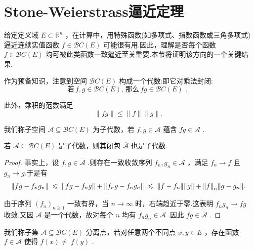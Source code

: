 \section{Stone-Weierstrass逼近定理}

给定定义域 $E \subset  {\mathbb{R}}^{n}$ ，在计算中，用特殊函数(如多项式、指数函数或三角多项式)逼近连续实值函数 $f \in  \mathcal{B}C\left( E\right)$ 可能很有用.因此，理解是否每个函数 $f \in  \mathcal{B}C\left( E\right)$ 均可被此类函数一致逼近至关重要.本节将证明该方向的一个关键结果.

作为预备知识，注意到空间 $\mathcal{B}C\left( E\right)$ 构成一个代数:即它对乘法封闭:
\[
\text{若}\,f,g \in  \mathcal{B}C\left( E\right),\,\text{那么}\,{fg} \in  \mathcal{B}C\left( E\right) \text{ . }
\]

此外，乘积的范数满足
\[
\| {fg}\|  \leq  \| f\| \| g\| .
\]

我们称子空间 $\mathcal{A} \subseteq  \mathcal{B}C\left( E\right)$ 为子代数，若 $f,g \in  \mathcal{A}$ 蕴含 ${fg} \in  \mathcal{A}$ .

\begin{lemma}[子代数的闭包]\label{lem:subalgebra-closure}
若 $\mathcal{A} \subseteq  \mathcal{B}C\left( E\right)$ 是子代数，则其闭包 $\overline{\mathcal{A}}$ 也是子代数.
\end{lemma}

\begin{proof}
事实上，设 $f,g \in  \overline{\mathcal{A}}$ .则存在一致收敛序列 ${f}_{n},{g}_{n} \in  \mathcal{A}$ ，满足 ${f}_{n} \rightarrow  f$ 且 ${g}_{n} \rightarrow  g$.于是有
\[
\norm{{fg} - {f}_{n}{g}_{n}}\; \leqslant  \;\norm{{fg} - {f}_{n}g} + \norm{{f}_{n}g - {f}_{n}{g}_{n}}\; \leqslant  \;\norm{f - {f}_{n}}\norm{g} + \norm{f}_{n}\norm{g - {g}_{n}}.
\]

由于序列 ${\left( {f}_{n}\right) }_{n \geq  1}$ 一致有界，当 $n \rightarrow  \infty$ 时，右端趋近于零.这表明 ${f}_{n}{g}_{n} \rightarrow  {fg}$ 收敛.又因 $\mathcal{A}$ 是一个代数，故对每个 $n$ 均有 ${f}_{n}{g}_{n} \in  \mathcal{A}$ .因此 ${fg} \in  \overline{\mathcal{A}}$ .
\end{proof}

我们称子集 $\mathcal{A} \subseteq  \mathcal{B}C\left( E\right)$ 分离点，若对任意两个不同点 $x,y \in  E$ ，存在函数 $f \in  \mathcal{A}$ 使得 $f\left( x\right)  \neq \; f\left( y\right)$ .

